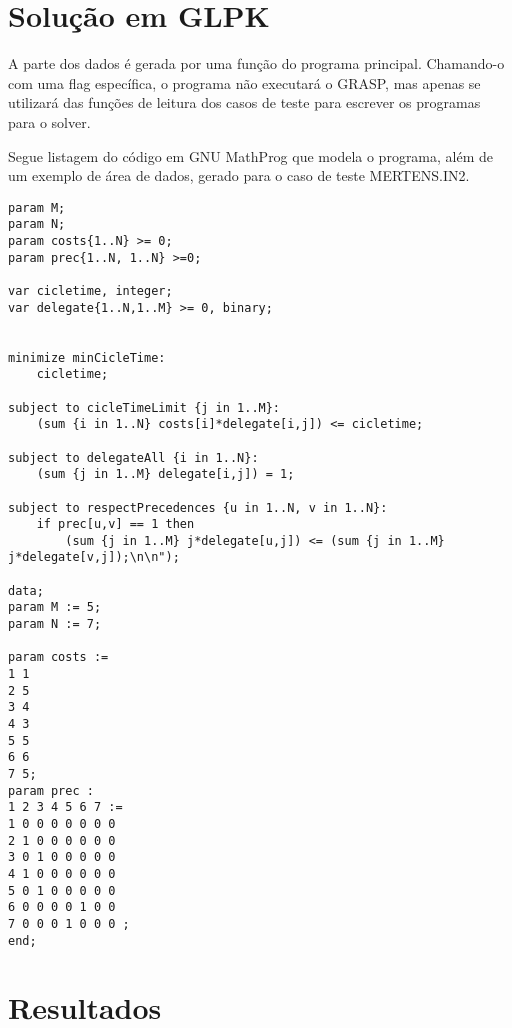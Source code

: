 \documentclass{report}
\begin{document}
\section{Solução em GLPK}

A parte dos dados é gerada por uma função do programa principal. Chamando-o com  uma flag específica, o programa não executará o GRASP, mas apenas se utilizará das funções de leitura dos casos de teste para escrever os programas para o solver.

Segue listagem do código em GNU MathProg que modela o programa, além de um exemplo de área de dados, gerado para o caso de teste MERTENS.IN2.

\begin{lstlisting}
param M;
param N;
param costs{1..N} >= 0;
param prec{1..N, 1..N} >=0;

var cicletime, integer;
var delegate{1..N,1..M} >= 0, binary;


minimize minCicleTime:
	cicletime;

subject to cicleTimeLimit {j in 1..M}:
	(sum {i in 1..N} costs[i]*delegate[i,j]) <= cicletime;

subject to delegateAll {i in 1..N}:
	(sum {j in 1..M} delegate[i,j]) = 1;

subject to respectPrecedences {u in 1..N, v in 1..N}:
	if prec[u,v] == 1 then
		(sum {j in 1..M} j*delegate[u,j]) <= (sum {j in 1..M} j*delegate[v,j]);\n\n");

data;
param M := 5;
param N := 7;

param costs :=
1 1
2 5
3 4
4 3
5 5
6 6
7 5;
param prec :
1 2 3 4 5 6 7 :=
1 0 0 0 0 0 0 0 
2 1 0 0 0 0 0 0 
3 0 1 0 0 0 0 0 
4 1 0 0 0 0 0 0 
5 0 1 0 0 0 0 0 
6 0 0 0 0 1 0 0 
7 0 0 0 1 0 0 0 ;
end;
\end{lstlisting}

\section{Resultados}
\end{document}
